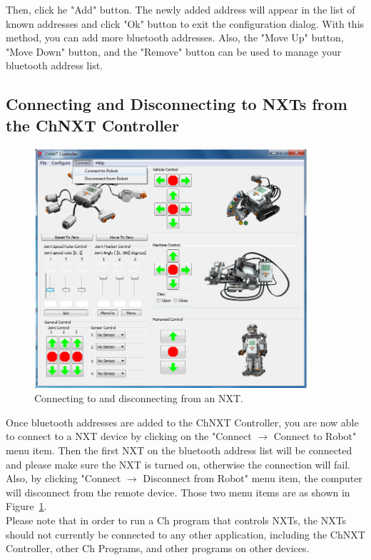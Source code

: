 \documentclass[11pt]{article}
\begin{document}
Then, click he "Add" button. The newly added address will appear in the list of known addresses and click "Ok" button to exit 
the configuration dialog. With this method, you can add more bluetooth addresses. Also, the "Move Up" button, "Move Down" 
button, and the "Remove" button can be used to manage your bluetooth address list.

\subsection{Connecting and Disconnecting to NXTs from the ChNXT Controller}
\begin{figure}[H]
  \begin{center}
    \includegraphics[height=3.5in]{figure/configuration/menuConnect.png}
    \caption{Connecting to and disconnecting from an NXT.\label{fig:menu_connect}}
  \end{center}
\end{figure}

Once bluetooth addresses are added to the ChNXT Controller, you are now able to connect to a NXT device by clicking on the 
"Connect $\rightarrow$ Connect to Robot" menu item. Then the first NXT on the bluetooth address list will be connected and please make
sure the NXT is turned on, otherwise the connection will fail. Also, by clicking "Connect $\rightarrow$ Disconnect from Robot" menu 
item, the computer will disconnect from the remote device. Those two menu items are as shown in Figure~\ref{fig:menu_connect}.\\

Please note that in order to run a Ch program that controls NXTs, the NXTs should not currently be connected to any other
application, including the ChNXT Controller, other Ch Programs, and other programs on other devices.\\
\end{document}
